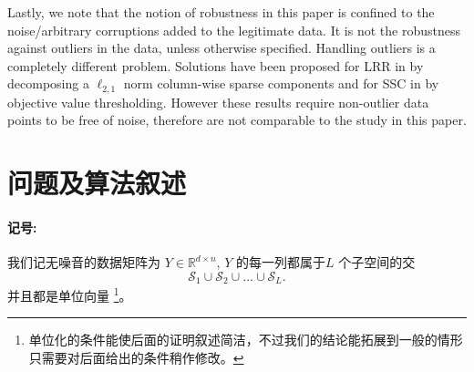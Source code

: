 \documentclass{ctexart}
\begin{document}





Lastly, we note that the notion of robustness in this paper is confined to the noise/arbitrary corruptions added to the legitimate data. It is not the robustness against outliers in the data, unless otherwise specified. Handling outliers is a completely different problem. Solutions have been proposed for LRR in \cite{liu2012aistats} by decomposing a $\ell_{2,1}$ norm column-wise sparse components and for SSC in \cite{soltanolkotabi2011geometric} by objective value thresholding. However these results require non-outlier data points to be free of noise, therefore are not comparable to the study in this paper.



\section{问题及算法叙述}\label{sec:prob_setup}
\paragraph{记号: }
我们记无噪音的数据矩阵为 $Y \in \mathbb{R}^{d\times n}$,  $Y$ 的每一列都属于$L$
个子空间的交
$$\mathcal{S}_1 \cup \mathcal{S}_2 \cup...\cup \mathcal{S}_L.$$
并且都是单位向量
\footnote{单位化的条件能使后面的证明叙述简洁，不过我们的结论能拓展到一般的情形只需要对后面给出的条件稍作修改。}。
\end{document}
